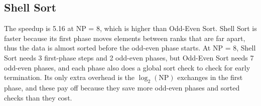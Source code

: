 \subsection{Shell Sort}

\begin{table}[H]
  \centering
  \small
  
  \caption{Shell Sort: median of 5 runs for $n = 10^7$.}
  \label{tab:shell-scaling}
\end{table}

The speedup is 5.16 at NP = 8, which is higher than Odd-Even Sort.
Shell Sort is faster because its first phase moves elements between ranks that are far apart, thus the data is almost sorted before the odd-even phase starts.
At NP = 8, Shell Sort needs 3 first-phase steps and 2 odd-even phases, but Odd-Even Sort needs 7 odd-even phases, and each phase also does a global sort check to check for early termination.
Its only extra overhead is the $\log_2(\mathrm{NP})$ exchanges in the first phase, and these pay off because they save more odd-even phases and sorted checks than they cost.
